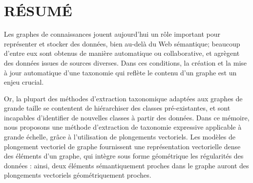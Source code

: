 %
\chapter*{RÉSUMÉ}\thispagestyle{headings}







Les graphes de connaissances jouent aujourd'hui un rôle important pour représenter et stocker des données, bien au-delà du Web sémantique;
beaucoup d'entre eux sont obtenus de manière automatique ou collaborative, et agrègent des données issues de sources diverses. Dans ces conditions, la création et la mise à jour automatique d'une taxonomie qui reflète le contenu d'un graphe est un enjeu crucial.


Or, la plupart des méthodes d'extraction taxonomique adaptées aux graphes de grande taille se contentent de hiérarchiser des classes pré-existantes, et sont incapables d'identifier de nouvelles classes à partir des données. Dans ce mémoire, nous proposons une méthode d'extraction de taxonomie expressive applicable à grande échelle, grâce à l'utilisation de plongements vectoriels. Les modèles de plongement vectoriel de graphe fournissent une représentation vectorielle dense des éléments d'un graphe, qui intègre sous forme géométrique les régularités des données : ainsi, deux éléments sémantiquement proches dans le graphe auront des plongements vectoriels géométriquement proches.


